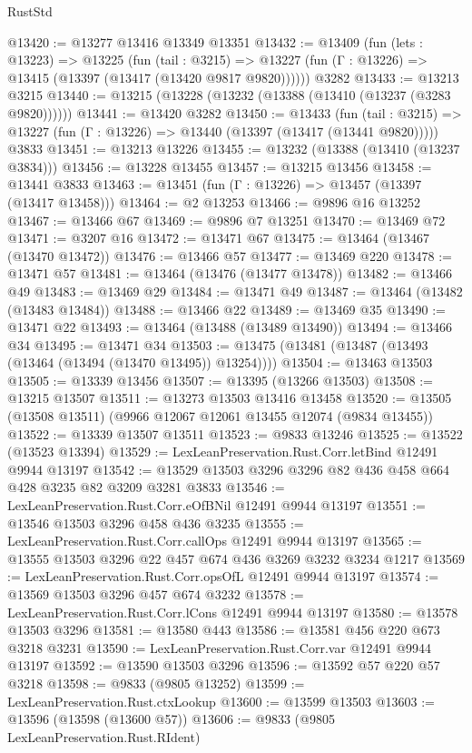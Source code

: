 \begin{lexlean}{RustStd}
\begin{coremodule}
@13420 := @13277 @13416 @13349 @13351
@13432 := @13409
    (fun (lets : @13223) =>
    @13225
      (fun (tail : @3215) =>
      @13227 (fun (Γ : @13226) => @13415 (@13397 (@13417 (@13420 @9817 @9820))))))
    @3282
@13433 := @13213 @3215
@13440 := @13215 (@13228 (@13232 (@13388 (@13410 (@13237 (@3283 @9820))))))
@13441 := @13420 @3282
@13450 := @13433
    (fun (tail : @3215) => @13227 (fun (Γ : @13226) => @13440 (@13397 (@13417 (@13441 @9820)))))
    @3833
@13451 := @13213 @13226
@13455 := @13232 (@13388 (@13410 (@13237 @3834)))
@13456 := @13228 @13455
@13457 := @13215 @13456
@13458 := @13441 @3833
@13463 := @13451 (fun (Γ : @13226) => @13457 (@13397 (@13417 @13458)))
@13464 := @2 @13253
@13466 := @9896 @16 @13252
@13467 := @13466 @67
@13469 := @9896 @7 @13251
@13470 := @13469 @72
@13471 := @3207 @16
@13472 := @13471 @67
@13475 := @13464 (@13467 (@13470 @13472))
@13476 := @13466 @57
@13477 := @13469 @220
@13478 := @13471 @57
@13481 := @13464 (@13476 (@13477 @13478))
@13482 := @13466 @49
@13483 := @13469 @29
@13484 := @13471 @49
@13487 := @13464 (@13482 (@13483 @13484))
@13488 := @13466 @22
@13489 := @13469 @35
@13490 := @13471 @22
@13493 := @13464 (@13488 (@13489 @13490))
@13494 := @13466 @34
@13495 := @13471 @34
@13503 := @13475 (@13481 (@13487 (@13493 (@13464 (@13494 (@13470 @13495)) @13254))))
@13504 := @13463 @13503
@13505 := @13339 @13456
@13507 := @13395 (@13266 @13503)
@13508 := @13215 @13507
@13511 := @13273 @13503 @13416 @13458
@13520 := @13505 (@13508 @13511) (@9966 @12067 @12061 @13455 @12074 (@9834 @13455))
@13522 := @13339 @13507 @13511
@13523 := @9833 @13246
@13525 := @13522 (@13523 @13394)
@13529 := LexLeanPreservation.Rust.Corr.letBind @12491 @9944 @13197
@13542 := @13529 @13503 @3296 @3296 @82 @436 @458 @664 @428 @3235 @82 @3209 @3281 @3833
@13546 := LexLeanPreservation.Rust.Corr.eOfBNil @12491 @9944 @13197
@13551 := @13546 @13503 @3296 @458 @436 @3235
@13555 := LexLeanPreservation.Rust.Corr.callOps @12491 @9944 @13197
@13565 := @13555 @13503 @3296 @22 @457 @674 @436 @3269 @3232 @3234 @1217
@13569 := LexLeanPreservation.Rust.Corr.opsOfL @12491 @9944 @13197
@13574 := @13569 @13503 @3296 @457 @674 @3232
@13578 := LexLeanPreservation.Rust.Corr.lCons @12491 @9944 @13197
@13580 := @13578 @13503 @3296
@13581 := @13580 @443
@13586 := @13581 @456 @220 @673 @3218 @3231
@13590 := LexLeanPreservation.Rust.Corr.var @12491 @9944 @13197
@13592 := @13590 @13503 @3296
@13596 := @13592 @57 @220 @57 @3218
@13598 := @9833 (@9805 @13252)
@13599 := LexLeanPreservation.Rust.ctxLookup
@13600 := @13599 @13503
@13603 := @13596 (@13598 (@13600 @57))
@13606 := @9833 (@9805 LexLeanPreservation.Rust.RIdent)

\end{coremodule}
\end{lexlean}
